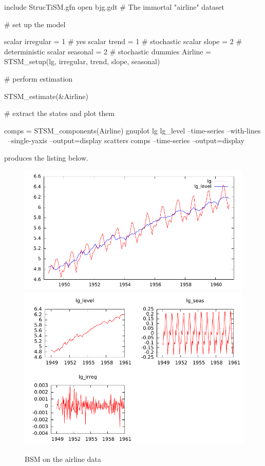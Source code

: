 \documentclass[a4paper,10pt]{article}
\begin{document}
\begin{code}
  include StrucTiSM.gfn
  open bjg.gdt # The immortal "airline" dataset

  # set up the model

  scalar irregular = 1 # yes
  scalar trend = 1     # stochastic
  scalar slope = 2     # deterministic
  scalar seasonal = 2  # stochastic dummies
  Airline = STSM_setup(lg, irregular, trend, slope, seasonal)

  # perform estimation

  STSM_estimate(&Airline)

  # extract the states and plot them
  
  comps = STSM_components(Airline)
  gnuplot lg lg_level --time-series --with-lines \
      --single-yaxis --output=display  
  scatters comps --time-series --output=display
\end{code}
produces the listing below.

\begin{figure}[htb]
  \caption{BSM on the airline data}
  \label{fig:airline}
  \centering
\includegraphics[scale=0.667]{ex1}
\includegraphics[scale=0.667]{ex2}
\end{figure}
\end{document}

